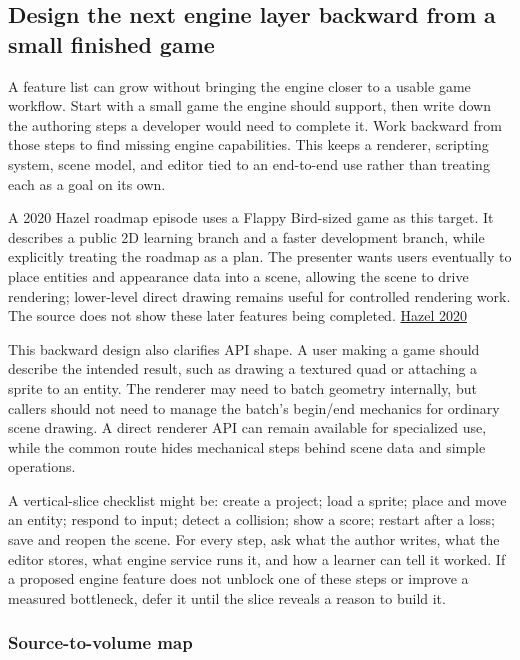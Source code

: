 \subsection{Design the next engine layer backward from a small finished game}\label{05-engine-i-ch013-design-the-next-engine-layer-backward-from-a-small-finished-game}

\hypertarget{05-engine-i-ch013-design-the-next-engine-layer-backward-from-a-small-finished-game}{}

A feature list can grow without bringing the engine closer to a usable game workflow. Start with a small game the engine should support, then write down the authoring steps a developer would need to complete it. Work backward from those steps to find missing engine capabilities. This keeps a renderer, scripting system, scene model, and editor tied to an end-to-end use rather than treating each as a goal on its own.

A 2020 Hazel roadmap episode uses a Flappy Bird-sized game as this target. It describes a public 2D learning branch and a faster development branch, while explicitly treating the roadmap as a plan. The presenter wants users eventually to place entities and appearance data into a scene, allowing the scene to drive rendering; lower-level direct drawing remains useful for controlled rendering work. The source does not show these later features being completed. \href{https://www.youtube.com/watch?v=6BHhNELSnDU}{Hazel 2020}

This backward design also clarifies API shape. A user making a game should describe the intended result, such as drawing a textured quad or attaching a sprite to an entity. The renderer may need to batch geometry internally, but callers should not need to manage the batch's begin/end mechanics for ordinary scene drawing. A direct renderer API can remain available for specialized use, while the common route hides mechanical steps behind scene data and simple operations.

A vertical-slice checklist might be: create a project; load a sprite; place and move an entity; respond to input; detect a collision; show a score; restart after a loss; save and reopen the scene. For every step, ask what the author writes, what the editor stores, what engine service runs it, and how a learner can tell it worked. If a proposed engine feature does not unblock one of these steps or improve a measured bottleneck, defer it until the slice reveals a reason to build it.

\subsubsection{Source-to-volume map}\label{05-engine-i-ch013-source-to-volume-map}

